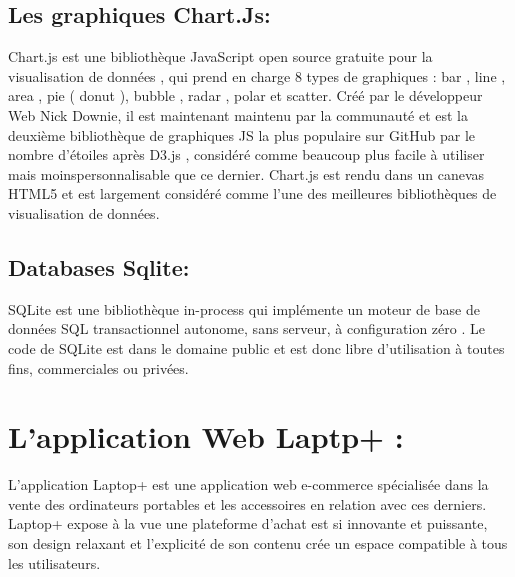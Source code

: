 \documentclass[a4paper]{report}
\begin{document}
\begin{doublespace}
\begin{doublespace}
\begin{doublespace}
\begin{doublespace}
\begin{doublespace}
\begin{doublespace}
                        \subsection{ Les graphiques Chart.Js:}
                        \begin{figure}[H]
                            \raggedleft{
                            }
                        \end{figure}
                        Chart.js est une bibliothèque JavaScript open source gratuite pour la visualisation de données , qui prend en charge 8 types de graphiques : bar , line , area , pie ( donut ), bubble , radar , polar et scatter. Créé par le développeur Web  Nick Downie, il est maintenant maintenu par la communauté et est la deuxième bibliothèque de graphiques JS la plus populaire sur GitHub par le nombre d'étoiles après D3.js , considéré comme beaucoup plus facile à utiliser mais moinspersonnalisable que ce dernier. Chart.js est rendu dans un canevas HTML5 et est largement considéré comme l'une des meilleures bibliothèques de visualisation de données.
                        \subsection{Databases Sqlite:}
                        \begin{figure}[H]
                            \raggedleft{
                            }
                        \end{figure}
                        SQLite est une bibliothèque in-process qui implémente un moteur de base de données SQL transactionnel autonome, sans serveur, à configuration zéro . Le code de SQLite est dans le domaine public et est donc libre d'utilisation à toutes fins, commerciales ou privées.
                        \newpage
                        \section{L'application Web Laptp+ :}
                        L'application Laptop+ est une application web e-commerce spécialisée dans la vente des ordinateurs portables et les accessoires en relation avec ces derniers. \\Laptop+ expose à la vue une plateforme d'achat est si innovante et puissante, son design relaxant et l’explicité de son contenu crée un espace compatible à tous les utilisateurs.


\end{doublespace}
\end{doublespace}
\end{doublespace}
\end{doublespace}
\end{doublespace}
\end{doublespace}
\end{document}
